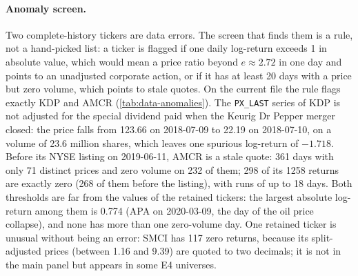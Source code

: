 \paragraph{Anomaly screen.}
Two complete-history tickers are data errors. The screen that finds them is a rule, not a
hand-picked list: a ticker is flagged if one daily log-return exceeds 1 in absolute value, which
would mean a price ratio beyond $e\approx2.72$ in one day and points to an unadjusted corporate
action, or if it has at least 20 days with a price but zero volume, which points to stale quotes.
On the current file the rule flags exactly KDP and AMCR (\cref{tab:data-anomalies}). The
\texttt{PX\_LAST} series of KDP is not adjusted for the special dividend paid when the Keurig Dr
Pepper merger closed: the price falls from 123.66 on 2018-07-09 to 22.19 on 2018-07-10, on a
volume of 23.6 million shares, which leaves one spurious log-return of $-1.718$. Before its NYSE
listing on 2019-06-11, AMCR is a stale quote: 361 days with only 71 distinct prices and zero
volume on 232 of them; 298 of its 1258 \TRAIN{} returns are exactly zero (268 of them before
the listing), with runs of up to 18 days. Both thresholds are far from the values of the
retained tickers: the largest absolute log-return among them is 0.774 (APA on 2020-03-09, the
day of the oil price collapse), and none has more than one zero-volume day. One retained ticker
is unusual without being an error: SMCI has 117 zero \TRAIN{} returns, because its
split-adjusted \TRAIN{} prices (between 1.16 and 9.39) are quoted to two decimals; it is not in
the main panel but appears in some E4 universes.

\begin{table}[tbp]
  \centering
  \caption{Anomaly screen: the two excluded tickers and, for reference, the extreme and median
    values over the 479 retained tickers.}
  \label{tab:data-anomalies}
  \small
\end{table}

